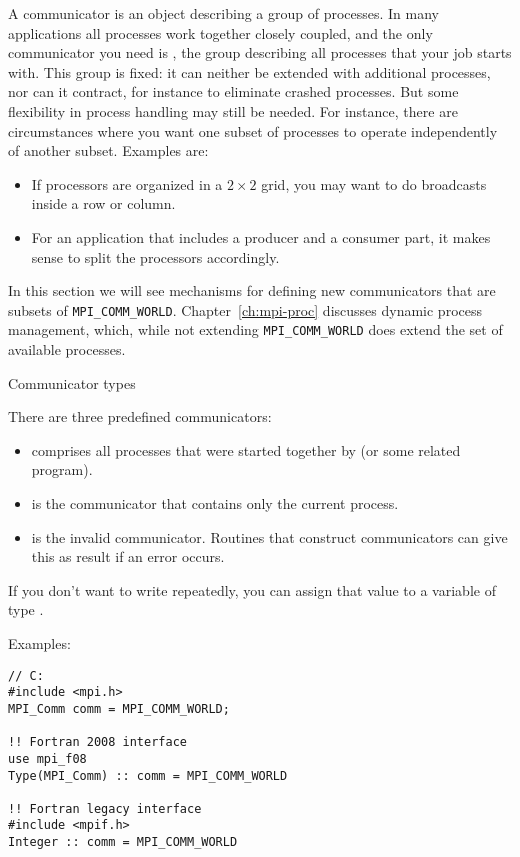 
A communicator is an object describing a group of processes. In many 
applications all processes work together closely coupled, and the
only communicator you need is , the
group describing all processes that your job starts with.
%
This group is fixed: it can neither be extended with additional
processes, nor can it contract, for instance to eliminate crashed
processes. But some flexibility in process handling may still be
needed. For instance, there are 
circumstances where you want one subset of processes to operate 
independently of another subset. Examples are:
\begin{itemize}
\item If processors are organized in a $2\times2$ grid, you may want
  to do broadcasts inside a row or column. 
\item For an application that includes a producer and a consumer part,
  it makes sense to split the processors accordingly.
\end{itemize}
In this section we will see mechanisms for defining new communicators
that are subsets of \lstinline{MPI_COMM_WORLD}.
Chapter~\ref{ch:mpi-proc} discusses dynamic process management, which, while
not extending \lstinline{MPI_COMM_WORLD} does extend the set of
available processes.

 {Communicator types}

There are three predefined communicators:
\begin{itemize}
\item {} comprises all processes that were started 
  together by  (or some related program).
\item {} is the communicator that contains only
   the current process.
\item {} is the invalid communicator. Routines
  that construct communicators can give this as result if an error occurs.
\end{itemize}

If you don't want to write  repeatedly, you can
assign that value to a variable of type .

Examples:
\begin{verbatim}
// C:
#include <mpi.h>
MPI_Comm comm = MPI_COMM_WORLD;

!! Fortran 2008 interface
use mpi_f08
Type(MPI_Comm) :: comm = MPI_COMM_WORLD

!! Fortran legacy interface
#include <mpif.h>
Integer :: comm = MPI_COMM_WORLD
\end{verbatim}

